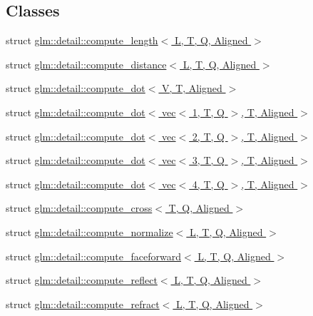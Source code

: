 \subsection*{Classes}
\begin{DoxyCompactItemize}
\item 
struct \hyperlink{structglm_1_1detail_1_1compute__length}{glm\+::detail\+::compute\+\_\+length$<$ L, T, Q, Aligned $>$}
\item 
struct \hyperlink{structglm_1_1detail_1_1compute__distance}{glm\+::detail\+::compute\+\_\+distance$<$ L, T, Q, Aligned $>$}
\item 
struct \hyperlink{structglm_1_1detail_1_1compute__dot}{glm\+::detail\+::compute\+\_\+dot$<$ V, T, Aligned $>$}
\item 
struct \hyperlink{structglm_1_1detail_1_1compute__dot_3_01vec_3_011_00_01_t_00_01_q_01_4_00_01_t_00_01_aligned_01_4}{glm\+::detail\+::compute\+\_\+dot$<$ vec$<$ 1, T, Q $>$, T, Aligned $>$}
\item 
struct \hyperlink{structglm_1_1detail_1_1compute__dot_3_01vec_3_012_00_01_t_00_01_q_01_4_00_01_t_00_01_aligned_01_4}{glm\+::detail\+::compute\+\_\+dot$<$ vec$<$ 2, T, Q $>$, T, Aligned $>$}
\item 
struct \hyperlink{structglm_1_1detail_1_1compute__dot_3_01vec_3_013_00_01_t_00_01_q_01_4_00_01_t_00_01_aligned_01_4}{glm\+::detail\+::compute\+\_\+dot$<$ vec$<$ 3, T, Q $>$, T, Aligned $>$}
\item 
struct \hyperlink{structglm_1_1detail_1_1compute__dot_3_01vec_3_014_00_01_t_00_01_q_01_4_00_01_t_00_01_aligned_01_4}{glm\+::detail\+::compute\+\_\+dot$<$ vec$<$ 4, T, Q $>$, T, Aligned $>$}
\item 
struct \hyperlink{structglm_1_1detail_1_1compute__cross}{glm\+::detail\+::compute\+\_\+cross$<$ T, Q, Aligned $>$}
\item 
struct \hyperlink{structglm_1_1detail_1_1compute__normalize}{glm\+::detail\+::compute\+\_\+normalize$<$ L, T, Q, Aligned $>$}
\item 
struct \hyperlink{structglm_1_1detail_1_1compute__faceforward}{glm\+::detail\+::compute\+\_\+faceforward$<$ L, T, Q, Aligned $>$}
\item 
struct \hyperlink{structglm_1_1detail_1_1compute__reflect}{glm\+::detail\+::compute\+\_\+reflect$<$ L, T, Q, Aligned $>$}
\item 
struct \hyperlink{structglm_1_1detail_1_1compute__refract}{glm\+::detail\+::compute\+\_\+refract$<$ L, T, Q, Aligned $>$}
\end{DoxyCompactItemize}
